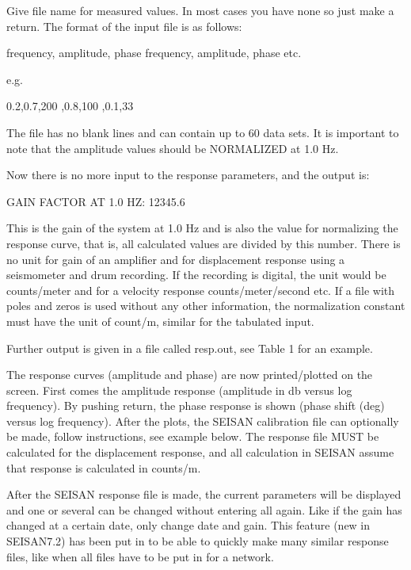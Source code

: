 Give file name for measured values. In most cases you have none so just make a return. The format of the input file is as follows: 

frequency, amplitude, phase \newline
frequency, amplitude, phase \newline
etc. 

e.g. 

0.2,0.7,200 ,0.8,100 ,0.1,33 

The file has no blank lines and can contain up to 60 data sets. It is important to note that the amplitude values should be NORMALIZED at 1.0 Hz. 

Now there is no more input to the response parameters, and the output is: 

GAIN FACTOR AT 1.0 HZ: 12345.6 

This is the gain of the system at 1.0 Hz and is also the value for normalizing the response curve, that is, all calculated values are divided by this number. There is no unit for gain of an amplifier and for displacement response using a seismometer and drum recording. If the recording is digital, the unit would be counts/meter and for a velocity response counts/meter/second etc. If a file with poles and zeros is used without any other information, the normalization constant must have the unit of count/m, similar for the tabulated input. 

Further output is given in a file called resp.out, see Table 1 for an example. 

The response curves (amplitude and phase) are now printed/plotted on the screen. First comes the amplitude response (amplitude in db versus log frequency). By pushing return, the phase response is shown (phase shift (deg) versus log frequency). After the plots, the SEISAN calibration file can optionally be made, follow instructions, see example below. The response file MUST be calculated for the displacement response, and all calculation in SEISAN assume that response is calculated in counts/m. 

After the SEISAN response file is made, the current parameters will be displayed and one or several can be changed without entering all again. Like if the gain has changed at a certain date, only change date and gain. This feature (new in SEISAN7.2) has been put in to be able to quickly make many similar response files, like when all files have to be put in for a network. 

